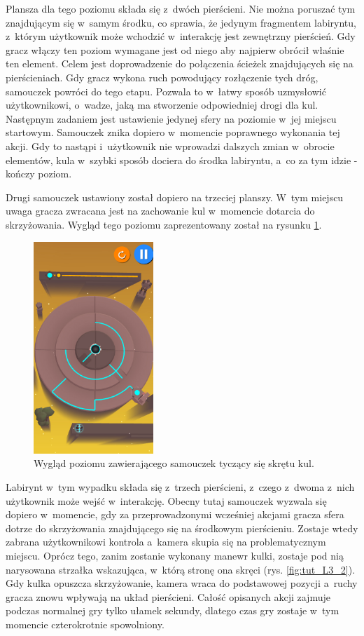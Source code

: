 \documentclass[a4paper,12pt,numbers=noenddot]{report}
\begin{document}
Plansza dla tego poziomu składa się z~dwóch pierścieni. Nie można poruszać tym znajdującym się w~samym środku, co sprawia, że jedynym fragmentem labiryntu, z~którym użytkownik może wchodzić w~interakcję jest zewnętrzny pierścień.
Gdy gracz włączy ten poziom wymagane jest od niego aby najpierw obrócił właśnie ten element. Celem jest doprowadzenie do połączenia ścieżek znajdujących się na pierścieniach. Gdy gracz wykona ruch powodujący rozłączenie tych dróg, samouczek powróci do tego etapu. Pozwala to w~łatwy sposób uzmysłowić użytkownikowi, o~wadze, jaką ma stworzenie odpowiedniej drogi dla kul. 
Następnym zadaniem jest ustawienie jedynej sfery na poziomie w~jej miejscu startowym. Samouczek znika dopiero w~momencie poprawnego wykonania tej akcji. Gdy to nastąpi i~użytkownik nie wprowadzi dalszych zmian w~obrocie elementów, kula w~szybki sposób dociera do środka labiryntu, a~co za tym idzie - kończy poziom.

Drugi samouczek ustawiony został dopiero na trzeciej planszy. W~tym miejscu uwaga gracza zwracana jest na zachowanie kul w~momencie dotarcia do skrzyżowania. Wygląd tego poziomu zaprezentowany został na rysunku \ref{fig:tut_L3_1}. 
\begin{figure}[h!]
	\centering
  	\includegraphics[height=8cm]{fig/l3.jpg}
	\caption{Wygląd poziomu zawierającego samouczek tyczący się skrętu kul.}
	\label{fig:tut_L3_1}
\end{figure}
Labirynt w~tym wypadku składa się z~trzech pierścieni, z~czego z~dwoma z~nich użytkownik może wejść w~interakcję. Obecny tutaj samouczek wyzwala się dopiero w~momencie, gdy za przeprowadzonymi wcześniej akcjami gracza sfera dotrze do skrzyżowania znajdującego się na środkowym pierścieniu. Zostaje wtedy zabrana użytkownikowi kontrola a~kamera skupia się na problematycznym miejscu. Oprócz tego, zanim zostanie wykonany manewr kulki, zostaje pod nią narysowana strzałka wskazująca, w~którą stronę ona skręci (rys. \ref{fig:tut_L3_2}). Gdy kulka opuszcza skrzyżowanie, kamera wraca do podstawowej pozycji a~ruchy gracza znowu wpływają na układ pierścieni. Całość opisanych akcji zajmuje podczas normalnej gry tylko ułamek sekundy, dlatego czas gry zostaje w~tym momencie czterokrotnie spowolniony. 
\end{document}
